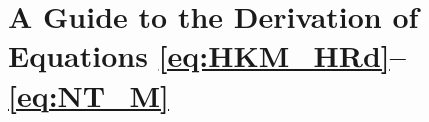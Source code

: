 \documentclass{jsarticle}
\begin{document}
\appendix
\section{A Guide to the Derivation of Equations \eqref{eq:HKM_HRd}--\eqref{eq:NT_M}} \label{sec:guide_for_dir_eq}


\end{document}
